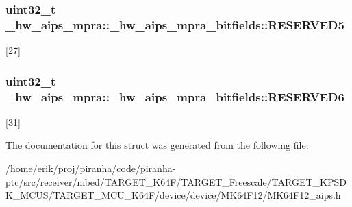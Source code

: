 \subsubsection[{\texorpdfstring{R\+E\+S\+E\+R\+V\+E\+D5}{RESERVED5}}]{\setlength{\rightskip}{0pt plus 5cm}uint32\+\_\+t \+\_\+hw\+\_\+aips\+\_\+mpra\+::\+\_\+hw\+\_\+aips\+\_\+mpra\+\_\+bitfields\+::\+R\+E\+S\+E\+R\+V\+E\+D5}\hypertarget{struct__hw__aips__mpra_1_1__hw__aips__mpra__bitfields_a305196e27773469c7b3eb8e7d14a70a1}{}\label{struct__hw__aips__mpra_1_1__hw__aips__mpra__bitfields_a305196e27773469c7b3eb8e7d14a70a1}
\mbox{[}27\mbox{]} 
\subsubsection[{\texorpdfstring{R\+E\+S\+E\+R\+V\+E\+D6}{RESERVED6}}]{\setlength{\rightskip}{0pt plus 5cm}uint32\+\_\+t \+\_\+hw\+\_\+aips\+\_\+mpra\+::\+\_\+hw\+\_\+aips\+\_\+mpra\+\_\+bitfields\+::\+R\+E\+S\+E\+R\+V\+E\+D6}\hypertarget{struct__hw__aips__mpra_1_1__hw__aips__mpra__bitfields_a1a5c7f4fcee6df73eeb62c372a123868}{}\label{struct__hw__aips__mpra_1_1__hw__aips__mpra__bitfields_a1a5c7f4fcee6df73eeb62c372a123868}
\mbox{[}31\mbox{]} 

The documentation for this struct was generated from the following file\+:\begin{DoxyCompactItemize}
\item 
/home/erik/proj/piranha/code/piranha-\/ptc/src/receiver/mbed/\+T\+A\+R\+G\+E\+T\+\_\+\+K64\+F/\+T\+A\+R\+G\+E\+T\+\_\+\+Freescale/\+T\+A\+R\+G\+E\+T\+\_\+\+K\+P\+S\+D\+K\+\_\+\+M\+C\+U\+S/\+T\+A\+R\+G\+E\+T\+\_\+\+M\+C\+U\+\_\+\+K64\+F/device/device/\+M\+K64\+F12/M\+K64\+F12\+\_\+aips.\+h\end{DoxyCompactItemize}
